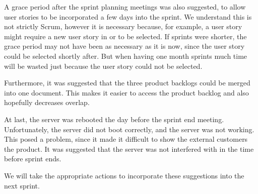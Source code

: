 A grace period after the sprint planning meetings was also suggested, to allow user stories to be incorporated a few days into the sprint. We understand this is not strictly Scrum, however it is necessary because, for example, a \db user story might require a new user story in \gui or \bd to be selected. If sprints were shorter, the grace period may not have been as necessary as it is now, since the user story could be selected shortly after. But when having one month sprints much time will be wasted just because the user story could not be selected.

Furthermore, it was suggested that the three product backlogs could be merged into one document. This makes it easier to access the product backlog and also hopefully decreases overlap.

At last, the server was rebooted the day before the \gui sprint end meeting. Unfortunately, the server did not boot correctly, and the server was not working. This posed a problem, since it made it difficult to show the external customers the product. It was suggested that the server was not interfered with in the time before sprint ends.

We will take the appropriate actions to incorporate these suggestions into the next sprint.